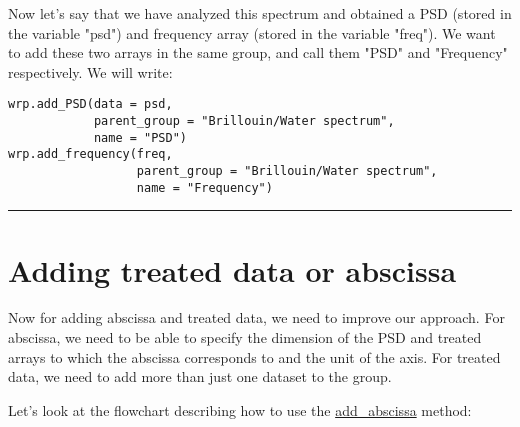 Now let's say that we have analyzed this spectrum and obtained a PSD (stored in the variable "psd") and frequency array (stored in the variable "freq"). We want to add these two arrays in the same group, and call them "PSD" and "Frequency" respectively. We will write:
\begin{lstlisting}
wrp.add_PSD(data = psd,
            parent_group = "Brillouin/Water spectrum", 
            name = "PSD")
wrp.add_frequency(freq,
                  parent_group = "Brillouin/Water spectrum", 
                  name = "Frequency")
\end{lstlisting}

\begin{center}
    \rule{15cm}{0.4pt}
\end{center}

\section{Adding treated data or abscissa}
Now for adding abscissa and treated data, we need to improve our approach. For abscissa, we need to be able to specify the dimension of the PSD and treated arrays to which the abscissa corresponds to and the unit of the axis. For treated data, we need to add more than just one dataset to the group. 

Let's look at the flowchart describing how to use the \hyperref[subsec:wrapper.add_abscissa]{add\_abscissa} method:

